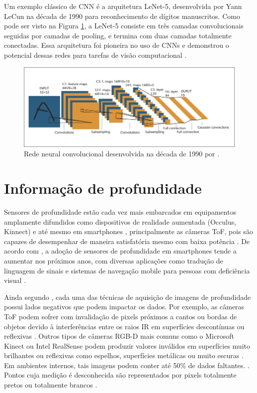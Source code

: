 Um exemplo clássico de CNN é a arquitetura LeNet-5, desenvolvida por Yann LeCun na década de 1990 para reconhecimento de dígitos manuscritos. Como pode ser visto na Figura \ref{fig:lenet5}, a LeNet-5 consiste em três camadas convolucionais seguidas por camadas de pooling, e termina com duas camadas totalmente conectadas. Essa arquitetura foi pioneira no uso de CNNs e demonstrou o potencial dessas redes para tarefas de visão computacional \cite{lecun1998gradient}.

\begin{figure}
    \centering   
    \includegraphics[width=\textwidth]{fig/A-Convolutional-Neural-Net-LeNet-5-From-Lecun-et-al-1998-C1998-IEEE-reprinted.png}
    \caption{Rede neural convolucional desenvolvida na década de 1990 por .}
    \label{fig:lenet5}
\end{figure}


\section{Informação de profundidade}
Sensores de profundidade estão cada vez mais embarcados em equipamentos amplamente difundidos como dispositivos de realidade aumentada (Occulus, Kinnect) e até mesmo em smartphones \cite{du2020depthlab}, principalmente as câmeras ToF, pois são capazes de desempenhar de maneira satisfatória mesmo com baixa potência \cite{branscombe2018microsoft}. De acordo com \cite{xie2021ultradepth}, a adoção de sensores de profundidade em smartphones tende a aumentar nos próximos anos, com diversas aplicações como tradução de linguagem de sinais \cite{park2021enabling} e sistemas de navegação mobile para pessoas com deficiência visual \cite{see2022smartphone}.


Ainda segundo \cite{castellano2023performance}, cada uma das técnicas de aquisição de imagens de profundidade possui lados negativos que podem impactar os dados. Por exemplo, as câmeras ToF podem sofrer com invalidação de pixels próximos a cantos ou bordas de objetos devido à interferências entre os raios IR em superfícies descontínuas ou reflexivas \cite{hansard2012time}. Outros tipos de câmeras RGB-D mais comuns como o Microsoft Kinect ou Intel RealSense podem produzir valores inválidos em superfícies muito brilhantes ou reflexivas como espelhos, superfícies metálicas ou muito escuras \cite{zollhofer2019commodity}. Em ambientes internos, tais imagens podem conter até 50\% de dados faltantes. \cite{zhang2022indepth} \cite{zhang2018deep}. Pontos cuja medição é desconhecida são representados por pixels totalmente pretos ou totalmente brancos \cite{dourado2020multi}.




